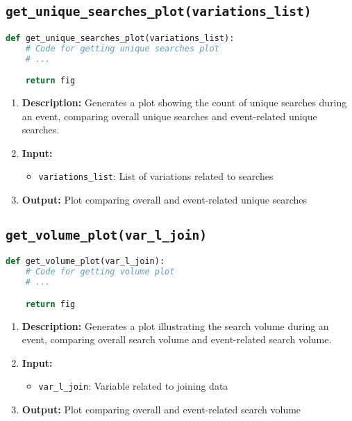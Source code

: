 \subsection{\texttt{get\_unique\_searches\_plot(variations\_list)}}
\begin{lstlisting}[language=Python]
def get_unique_searches_plot(variations_list):
    # Code for getting unique searches plot
    # ...

    return fig
\end{lstlisting}
\begin{enumerate}
    \item \textbf{Description:} Generates a plot showing the count of unique searches during an event, comparing overall unique searches and event-related unique searches.
    \item \textbf{Input:}
          \begin{itemize}
              \item \texttt{variations\_list}: List of variations related to searches
          \end{itemize}
    \item \textbf{Output:} Plot comparing overall and event-related unique searches
\end{enumerate}

\subsection{\texttt{get\_volume\_plot(var\_l\_join)}}
\begin{lstlisting}[language=Python]
def get_volume_plot(var_l_join):
    # Code for getting volume plot
    # ...

    return fig
\end{lstlisting}
\begin{enumerate}
    \item \textbf{Description:} Generates a plot illustrating the search volume during an event, comparing overall search volume and event-related search volume.
    \item \textbf{Input:}
          \begin{itemize}
              \item \texttt{var\_l\_join}: Variable related to joining data
          \end{itemize}
    \item \textbf{Output:} Plot comparing overall and event-related search volume
\end{enumerate}

